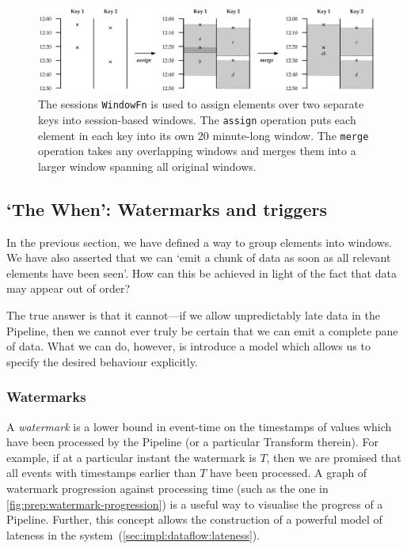 \begin{figure}[h]
	\includegraphics[width=\textwidth]{images/diags/sessions-assign-merge}
	\caption[A \texttt{WindowFn} is used to place elements into session-based, unaligned windows.]
	{The sessions \texttt{WindowFn} is used to assign elements over two separate keys into session-based windows. The \texttt{assign} operation puts each element in each key into its own 20 minute-long window. The \texttt{merge} operation takes any overlapping windows and merges them into a larger window spanning all original windows.}
	\label{fig:prep:sessions-merge}
\end{figure}


\subsection{`The When': Watermarks and triggers}\label{sec:prep:dataflow:when}

In the previous section, we have defined a way to group elements into windows.
We have also asserted that we can `emit a chunk of data as soon as all relevant elements have been seen'.
How can this be achieved in light of the fact that data may appear out of order?

The true answer is that it cannot---if we allow unpredictably late data in the Pipeline, then we cannot ever truly be certain that we can emit a complete pane of data.
What we can do, however, is introduce a model which allows us to specify the desired behaviour explicitly.

\subsubsection{Watermarks}

A \emph{watermark} is a lower bound in event-time on the timestamps of values which have been processed by the Pipeline (or a particular Transform therein).
For example, if at a particular instant the watermark is $T$, then we are promised that all events with timestamps earlier than $T$ have been processed.
A graph of watermark progression against processing time (such as the one in \cref{fig:prep:watermark-progression}) is a useful way to visualise the progress of a Pipeline.
Further, this concept allows the construction of a powerful model of lateness in the system~(\cref{sec:impl:dataflow:lateness}).

